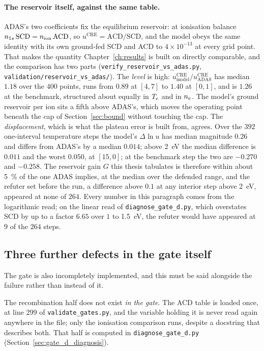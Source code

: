 \paragraph{The reservoir itself, against the same table.} ADAS's two
coefficients fix the equilibrium reservoir: at ionisation balance
$n_{1s}\,\mathrm{SCD} = n_{\mathrm{ion}}\,\mathrm{ACD}$, so
$u^{\mathrm{CRE}} = \mathrm{ACD}/\mathrm{SCD}$, and the model obeys the same
identity with its own ground-fed SCD and ACD to $4\times10^{-13}$ at every grid
point. That makes the quantity Chapter~\ref{ch:results} is built on directly
comparable, and the comparison has two parts
(\texttt{verify\_reservoir\_vs\_adas.py},
\texttt{validation/reservoir\_vs\_adas/}). The \emph{level} is high:
$u^{\mathrm{CRE}}_{\mathrm{model}}/u^{\mathrm{CRE}}_{\mathrm{ADAS}}$ has median
$1.18$ over the $400$ points, runs from $0.89$ at $[4,7]$ to $1.40$ at $[0,1]$,
and is $1.26$ at the benchmark, structured about equally in $T_e$ and in
$n_e$. The model's ground reservoir per ion sits a fifth above ADAS's, which
moves the operating point beneath the cap of Section~\ref{sec:bound} without
touching the cap. The \emph{displacement}, which is what the plateau error is
built from, agrees. Over the $392$ one-interval temperature steps the model's
$\Delta\ln u$ has median magnitude $0.26$ and differs from ADAS's by a median
$0.014$; above \SI{2}{\electronvolt} the median difference is $0.011$ and the
worst $0.050$, at $[15,0]$; at the benchmark step the two are $-0.270$ and
$-0.258$. The reservoir gain $G$ this thesis tabulates is therefore within
about \SI{5}{\percent} of the one ADAS implies, at the median over the
defended range, and the refuter set before the run, a difference above $0.1$
at any interior step above \SI{2}{\electronvolt}, appeared at none of $264$.
Every number in this paragraph comes from the logarithmic read; on the linear
read of \texttt{diagnose\_gate\_d.py}, which overstates SCD by up to a factor
$6.65$ over $1$ to \SI{1.5}{\electronvolt}, the refuter would have appeared at
$9$ of the $264$ steps.

\subsection{Three further defects in the gate itself}

The gate is also incompletely implemented, and this must be said alongside the
failure rather than instead of it.

The recombination half does not exist \emph{in the gate}. The ACD table is
loaded once, at line 299 of \texttt{validate\_gates.py}, and the variable
holding it is never read again anywhere in the file; only the ionisation
comparison runs, despite a docstring that describes both. That half is computed
in \texttt{diagnose\_gate\_d.py} (Section~\ref{sec:gate_d_diagnosis}).

